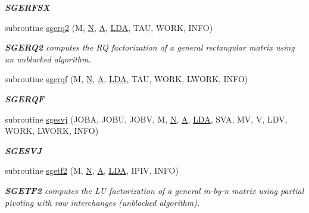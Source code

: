 \begin{DoxyCompactItemize}
\begin{DoxyCompactList}\small\item\em {\bfseries S\+G\+E\+R\+F\+S\+X} \end{DoxyCompactList}\item 
subroutine \hyperlink{group__realGEcomputational_ga5e9f3f3c1012927a2df1456522a0e297}{sgerq2} (M, \hyperlink{polmisc_8c_a0240ac851181b84ac374872dc5434ee4}{N}, \hyperlink{classA}{A}, \hyperlink{example__user_8c_ae946da542ce0db94dced19b2ecefd1aa}{L\+D\+A}, T\+A\+U, W\+O\+R\+K, I\+N\+F\+O)
\begin{DoxyCompactList}\small\item\em {\bfseries S\+G\+E\+R\+Q2} computes the R\+Q factorization of a general rectangular matrix using an unblocked algorithm. \end{DoxyCompactList}\item 
subroutine \hyperlink{group__realGEcomputational_ga6cf9836380912f68d520a17c77832d65}{sgerqf} (M, \hyperlink{polmisc_8c_a0240ac851181b84ac374872dc5434ee4}{N}, \hyperlink{classA}{A}, \hyperlink{example__user_8c_ae946da542ce0db94dced19b2ecefd1aa}{L\+D\+A}, T\+A\+U, W\+O\+R\+K, L\+W\+O\+R\+K, I\+N\+F\+O)
\begin{DoxyCompactList}\small\item\em {\bfseries S\+G\+E\+R\+Q\+F} \end{DoxyCompactList}\item 
subroutine \hyperlink{group__realGEcomputational_ga461f4ac32685a5ca30e293ee73d32920}{sgesvj} (J\+O\+B\+A, J\+O\+B\+U, J\+O\+B\+V, M, \hyperlink{polmisc_8c_a0240ac851181b84ac374872dc5434ee4}{N}, \hyperlink{classA}{A}, \hyperlink{example__user_8c_ae946da542ce0db94dced19b2ecefd1aa}{L\+D\+A}, S\+V\+A, M\+V, V, L\+D\+V, W\+O\+R\+K, L\+W\+O\+R\+K, I\+N\+F\+O)
\begin{DoxyCompactList}\small\item\em {\bfseries S\+G\+E\+S\+V\+J} \end{DoxyCompactList}\item 
subroutine \hyperlink{group__realGEcomputational_gab9b698b35b884b4d17b9713e76fabe37}{sgetf2} (M, \hyperlink{polmisc_8c_a0240ac851181b84ac374872dc5434ee4}{N}, \hyperlink{classA}{A}, \hyperlink{example__user_8c_ae946da542ce0db94dced19b2ecefd1aa}{L\+D\+A}, I\+P\+I\+V, I\+N\+F\+O)
\begin{DoxyCompactList}\small\item\em {\bfseries S\+G\+E\+T\+F2} computes the L\+U factorization of a general m-\/by-\/n matrix using partial pivoting with row interchanges (unblocked algorithm). \end{DoxyCompactList}\item 

\end{DoxyCompactItemize}
